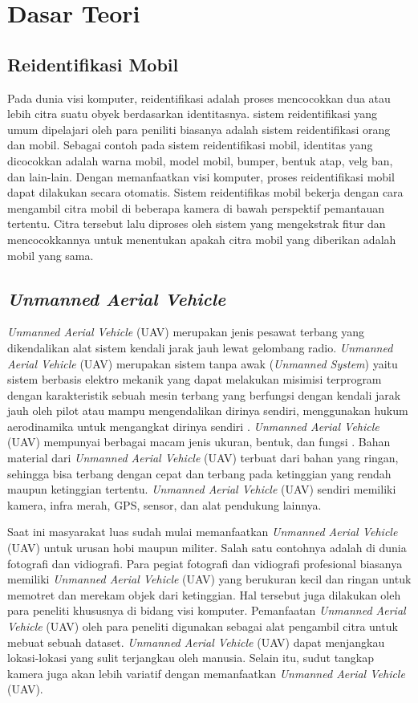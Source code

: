 \section{Dasar Teori}

\subsection{Reidentifikasi Mobil}

Pada dunia visi komputer, reidentifikasi adalah proses mencocokkan dua atau lebih citra suatu obyek berdasarkan identitasnya. sistem reidentifikasi yang umum dipelajari oleh para peniliti biasanya adalah sistem reidentifikasi orang dan mobil. Sebagai contoh pada sistem reidentifikasi mobil, identitas yang dicocokkan adalah warna mobil, model mobil, bumper, bentuk atap, velg ban, dan lain-lain. Dengan memanfaatkan visi komputer, proses reidentifikasi mobil dapat dilakukan secara otomatis. Sistem reidentifikas mobil bekerja dengan cara mengambil citra mobil di beberapa kamera di bawah perspektif pemantauan tertentu. Citra tersebut lalu diproses oleh sistem yang mengekstrak fitur dan mencocokkannya untuk menentukan apakah citra mobil yang diberikan adalah mobil yang sama.

\subsection{\emph{Unmanned Aerial Vehicle}}

\emph{Unmanned Aerial Vehicle} (UAV) merupakan jenis pesawat terbang yang dikendalikan alat sistem kendali jarak jauh lewat gelombang radio. \emph{Unmanned Aerial Vehicle} (UAV) merupakan sistem tanpa awak (\emph{Unmanned System}) yaitu sistem berbasis elektro mekanik yang dapat melakukan misimisi terprogram dengan karakteristik sebuah mesin terbang yang berfungsi dengan kendali jarak jauh oleh pilot atau mampu mengendalikan dirinya sendiri, menggunakan hukum aerodinamika untuk mengangkat dirinya sendiri \cite{UAV1}. \emph{Unmanned Aerial Vehicle} (UAV) mempunyai berbagai macam jenis ukuran, bentuk, dan fungsi \cite{UAV2}. Bahan material dari \emph{Unmanned Aerial Vehicle} (UAV) terbuat dari bahan yang ringan, sehingga bisa terbang dengan cepat dan terbang pada ketinggian yang rendah maupun ketinggian tertentu. \emph{Unmanned Aerial Vehicle} (UAV) sendiri memiliki kamera, infra merah, GPS, sensor, dan alat pendukung lainnya.

Saat ini masyarakat luas sudah mulai memanfaatkan \emph{Unmanned Aerial Vehicle} (UAV) untuk urusan hobi maupun militer. Salah satu contohnya adalah di dunia fotografi dan vidiografi. Para pegiat fotografi dan vidiografi profesional biasanya memiliki \emph{Unmanned Aerial Vehicle} (UAV) yang berukuran kecil dan ringan untuk memotret dan merekam objek dari ketinggian. Hal tersebut juga dilakukan oleh para peneliti khususnya di bidang visi komputer. Pemanfaatan \emph{Unmanned Aerial Vehicle} (UAV) oleh para peneliti digunakan sebagai alat pengambil citra untuk mebuat sebuah dataset. \emph{Unmanned Aerial Vehicle} (UAV) dapat menjangkau lokasi-lokasi yang sulit terjangkau oleh manusia. Selain itu, sudut tangkap kamera juga akan lebih variatif dengan memanfaatkan \emph{Unmanned Aerial Vehicle} (UAV).

